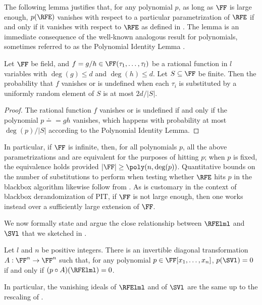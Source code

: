 \documentclass{toc}
\begin{document}
The following lemma justifies that,
for any polynomial \(p\),
as long as \(\FF\) is large enough,
\(p(\RFE)\) vanishes with respect to a particular parametrization of \(\RFE\)
if and only if
it vanishes with respect to \(\RFE\) as defined in .
The lemma is an %
%
%
immediate consequence %
of the well-known analogous result for polynomials, sometimes referred to as the
%
Polynomial Identity Lemma   %
\cite{Ore1922,DeMilloLipton1978,Zippel1979,Schwartz1980,arvind19}.
%
%
%

\begin{lemma}
  \label{lem.schwz}
  Let \(\FF\) be field,
  and \(f = g/h\in\FF(\tau_1,\ldots,\tau_l)\) be a rational function in \(l\)
  variables with \(\deg(g) \le d\) and \(\deg(h)\le d\).
  Let \(S\subseteq\FF\) be finite.
  Then the probability that \(f\) vanishes or is undefined when each
  \(\tau_i\) is substituted by a uniformly random element of \(S\)
  is at most \(2d/|S|\).
\end{lemma}
%
\begin{proof}
The rational function $f$ vanishes or is undefined if and only if the polynomial $p \doteq =gh$ vanishes, which happens with probability at most $\deg(p)/|S|$
according to the Polynomial Identity Lemma.
\end{proof}
%
%

In particular,
if \(\FF\) is infinite,
then, for all polynomials \(p\),
all the above parametrizations and 
are equivalent for the purposes of hitting \(p\);
when \(p\) is fixed,
the equivalence holds provided \(|\FF| \ge \poly(n, \deg(p))\).
Quantitative bounds on the number of substitutions to perform
when testing whether \(\RFE\) hits \(p\) in the blackbox algorithm
likewise follow from .
As is customary in the context of blackbox derandomization of PIT,
if $\FF$ is not large enough,
then one works instead over a sufficiently large extension of $\FF$.

\medskip

We now formally state and argue the close relationship between $\RFElml$ and $\SVl$ that we sketched in .
\begin{proposition}
  \label{prop.rfe-equiv-sv}
  Let $l$ and $n$ be positive integers.
  There is an invertible diagonal transformation \(A : \FF^n\to\FF^n\)
  such that, for any polynomial \(p\in\FF[x_1,\ldots,x_n]\),
  \(p(\SVl) = 0\) if and only if \((p\circ A)(\RFElml) = 0\).
\end{proposition}
In particular, the vanishing ideals of $\RFElml$ and of $\SVl$ are the
same up to the rescaling of .
\end{document}
